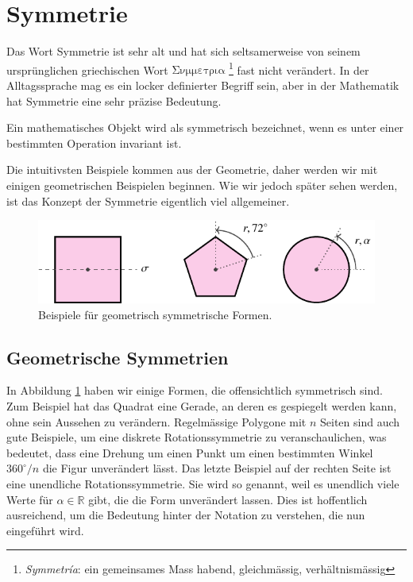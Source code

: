 \section{Symmetrie}
Das Wort Symmetrie ist sehr alt und hat sich seltsamerweise von seinem
ursprünglichen griechischen Wort
\(\mathrm{\Sigma\nu\mu\mu\varepsilon\tau\rho\iota\alpha}\)
\footnote{\emph{Symmetr\'ia}: ein gemeinsames Mass habend, gleichmässig,
verhältnismässig} fast nicht verändert. In der Alltagssprache mag es ein
locker definierter Begriff sein, aber in der Mathematik hat Symmetrie eine sehr
präzise Bedeutung.
\begin{definition}[Symmetrie]
	Ein mathematisches Objekt wird als symmetrisch bezeichnet, wenn es unter einer
	bestimmten Operation invariant ist.
\end{definition}
Die intuitivsten Beispiele kommen aus der Geometrie, daher werden wir mit
einigen geometrischen Beispielen beginnen. Wie wir jedoch später sehen werden,
ist das Konzept der Symmetrie eigentlich viel allgemeiner.  

\begin{figure}
	\centering
	\includegraphics{papers/punktgruppen/figures/symmetric-shapes}
	\caption{
		Beispiele für geometrisch symmetrische Formen.
		\label{fig:punktgruppen:geometry-example}
	}
\end{figure}

\subsection{Geometrische Symmetrien}

In Abbildung \ref{fig:punktgruppen:geometry-example} haben wir einige Formen,
die offensichtlich symmetrisch sind.  Zum Beispiel hat das Quadrat eine Gerade, an
deren es gespiegelt werden kann, ohne sein Aussehen zu verändern.  Regelmässige
Polygone mit \(n\) Seiten sind auch gute Beispiele, um eine diskrete
Rotationssymmetrie zu veranschaulichen, was bedeutet, dass eine Drehung um
einen Punkt um einen bestimmten Winkel \(360^\circ/n\) die Figur unverändert
lässt.  Das letzte Beispiel auf der rechten Seite ist eine unendliche
Rotationssymmetrie. Sie wird so genannt, weil es unendlich viele Werte für
\(\alpha \in \mathbb{R}\) gibt, die die Form unverändert lassen.  Dies ist
hoffentlich ausreichend, um die Bedeutung hinter der Notation zu verstehen, die
nun eingeführt wird.


